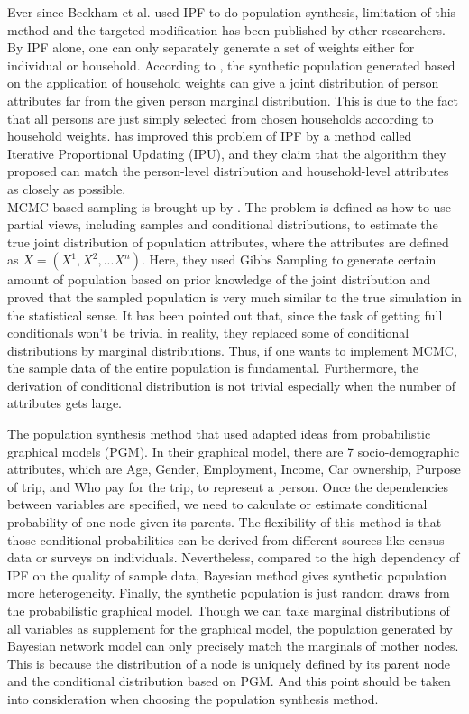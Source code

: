 \documentclass[11pt,twoside]{article}
\numberwithin{equation}{section}
\newcommand{\?}{\stackrel{?}{=}}
\begin{document}
Ever since Beckham et al. used IPF to do population synthesis, limitation of this method and the targeted modification has been published by other researchers. By IPF alone, one can only separately generate a set of weights either for individual or household. According to \cite{ye2009methodology}, the synthetic population generated based on the application of household weights can give a joint distribution of person attributes far from the given person marginal distribution.
This is due to the fact that all persons are just simply selected from chosen households according to household weights.
\textcite{ye2009methodology} has improved this problem of IPF by a method called Iterative Proportional Updating (IPU), and they claim that the algorithm they proposed can match the person-level distribution and household-level attributes as closely as possible. \\

MCMC-based sampling is brought up by \textcite{farooq2013simulation}.
The problem is defined as how to use partial views, including samples and conditional distributions, to estimate the true joint distribution of population attributes, where the attributes are defined as $X = (X^1, X^2, ... X^n)$.
Here, they used Gibbs Sampling to generate certain amount of population based on prior knowledge of the joint distribution and proved that the sampled population is very much similar to the true simulation in the statistical sense.
It has been pointed out that, since the task of getting full conditionals won't be trivial in reality, they replaced some of conditional distributions by marginal distributions.
Thus, if one wants to implement MCMC, the sample data of the entire population is fundamental.
Furthermore, the derivation of conditional distribution is not trivial especially when the number of attributes gets large.

The population synthesis method that %
used adapted ideas from probabilistic graphical models (PGM).
In their graphical model, there are 7 socio-demographic attributes, which are Age, Gender, Employment, Income, Car ownership, Purpose of trip, and Who pay for the trip, to represent a person.
Once the dependencies between variables are specified, we need to calculate or estimate conditional probability of one node given its parents.
The flexibility of this method is that those conditional probabilities can be derived from different sources like census data or surveys on individuals. Nevertheless, compared to the high dependency of IPF on the quality of sample data, Bayesian method gives synthetic population more heterogeneity.
Finally, the synthetic population is just random draws from the probabilistic graphical model.
Though we can take marginal distributions of all variables as supplement for the graphical model, the population generated by Bayesian network model can only precisely match the marginals of mother nodes.
This is because the distribution of a node is uniquely defined by its parent node and the conditional distribution based on PGM.
And this point should be taken into consideration when choosing the population synthesis method. 
\end{document}
